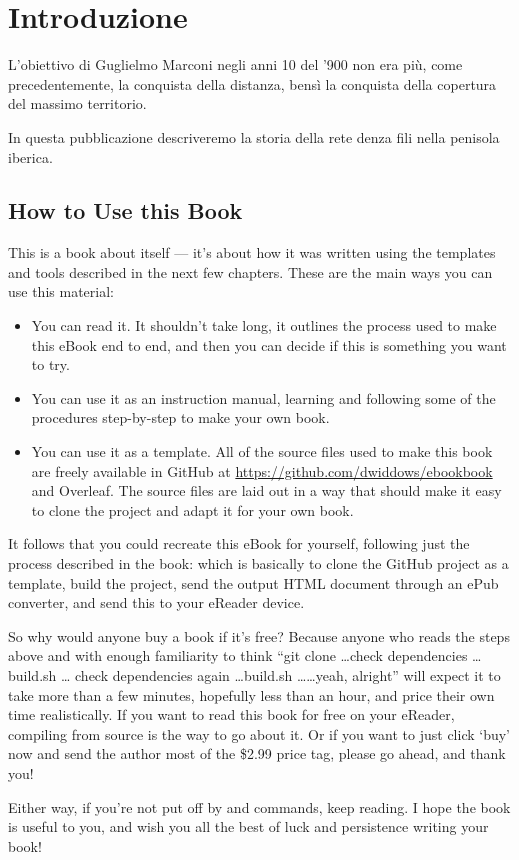 
\chapter{Introduzione}

L'obiettivo di Guglielmo Marconi negli anni 10 del '900 non era più, come precedentemente, la conquista della distanza, bensì la conquista della copertura del massimo territorio. 

In questa pubblicazione descriveremo la storia della rete denza fili nella penisola iberica.

\section{How to Use this Book}

This is a book about itself --- it's about how it was written using
the templates and tools described in 
the next few chapters. These are the main ways you can use this material:

\begin{itemize}
    \item You can read it. It shouldn't take long, it outlines the process
    used to make this eBook end to end, and then you can decide if this is something you want to try.
    \item You can use it as an instruction manual, learning and following some of the procedures step-by-step to make your own book.
    \item You can use it as a template. All of the source files used to make this book
    are freely available in GitHub at {\small \url{https://github.com/dwiddows/ebookbook}} and Overleaf.
    The source files are laid out in a way that should make it easy to clone the project and adapt it for your own book.
\end{itemize}

It follows that you could recreate this eBook for yourself, following just the process
described in the book: which is basically to clone the GitHub project as a template, build
the project, send the output HTML document through an ePub converter, and send this to
your eReader device.

So why would anyone buy a book if it's free? Because
anyone who reads the steps above and with enough familiarity to think
``git clone \ldots check dependencies \ldots  build.sh \ldots 
check dependencies again \ldots build.sh \ldots  \ldots yeah, alright'' will expect it to take
more than a few minutes, hopefully less than an hour, and price their own time realistically.
If you want to read this book for free on your eReader,
compiling from source is the way to go about it. Or if you want to just click `buy' now and send the author most of the
\$2.99 price tag, please go ahead, and thank you!

Either way, if you're not put off by \latex and 
commands, keep reading. I hope the book is useful to you, and wish you 
all the best of luck and persistence writing your book!
